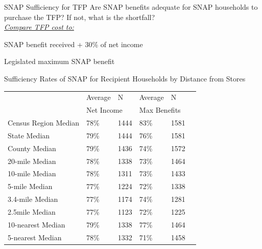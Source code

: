 \documentclass{beamer}
\begin{document}
\begin{frame}{SNAP Sufficiency for TFP}
 \large{Are SNAP benefits adequate for SNAP households to purchase the TFP? If not, what is the shortfall?}\\
\vskip6pt \hspace{2mm} \normalsize{\underline{\textit{Compare TFP cost to:}}}
\begin{itemize}
{\item SNAP benefit received + 30\% of net income} 
{\item Legislated maximum SNAP benefit} 
\end{itemize}

\end{frame}

\begin{frame}

\begin{table}[htbp]{Sufficiency Rates of SNAP for Recipient Households by Distance from Stores}

\begin{adjustbox}{height=1.5in}
  \centering
    \begin{tabular}{llllll}
    \toprule
          & Average  & N     & Average  & N \\

     & \multicolumn{2}{l}{Net Income} & \multicolumn{2}{l}{Max Benefits} \\

    \midrule
    Census Region Median & 78\%    & 1444  & 83\%    & 1581 \\
    State Median & 79\%    & 1444  & 76\%    & 1581 \\
    County Median & 79\%    & 1436  & 74\%    & 1572 \\
    20-mile Median & 78\%    & 1338  & 73\%    & 1464 \\
    10-mile Median & 78\%    & 1311  & 73\%    & 1433 \\
    5-mile Median & 77\%    & 1224  & 72\%    & 1338 \\
    3.4-mile Median & 77\%    & 1174  & 74\%    & 1281 \\
    2.5mile Median & 77\%    & 1123  & 72\%    & 1225 \\
    10-nearest Median & 79\%    & 1338  & 77\%    & 1464 \\
    5-nearest Median & 78\%    & 1332  & 71\%    & 1458 \\
      \bottomrule
    \end{tabular}
    \end{adjustbox}
	\end{table}

\end{frame}
\end{document}
